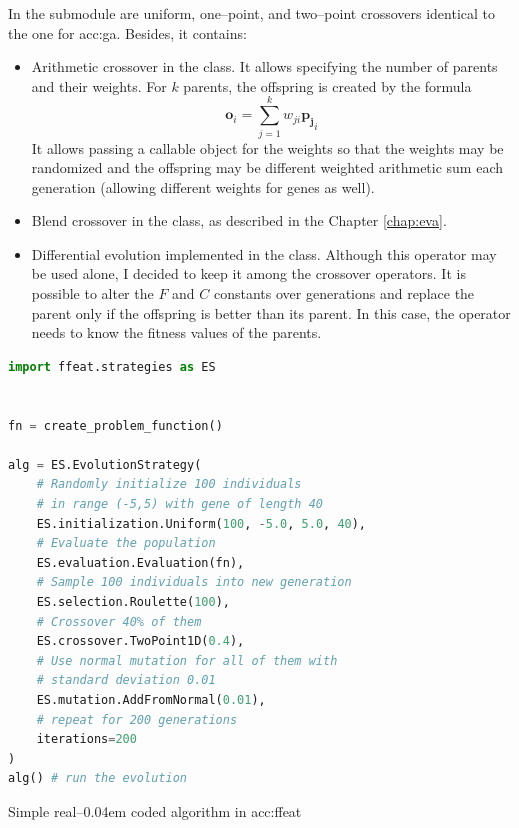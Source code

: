 In the  submodule are uniform, one--point, and two--point crossovers identical to the one for \acrshort{acc:ga}. Besides, it contains:
\begin{itemize}
    \item Arithmetic crossover in the  class. It allows specifying the number of parents and their weights. For $k$ parents, the offspring is created by the formula 
    $$\mathbf{o}_i=\sum_{j=1}^k w_{ji}\mathbf{p_j}_i$$
    It allows passing a callable object for the weights so that the weights may be randomized and the offspring may be different weighted arithmetic sum each generation (allowing different weights for genes as well).
    \item Blend crossover in the  class, as described in the Chapter \ref{chap:eva}.
    \item Differential evolution implemented in the  class. Although this operator may be used alone, I decided to keep it among the crossover operators. It is possible to alter the $F$ and $C$ constants over generations and replace the parent only if the offspring is better than its parent. In this case, the operator needs to know the fitness values of the parents.
\end{itemize}

\begin{algorithm}[b!]
\begin{lstlisting}[language=Python, xrightmargin=18pt]
import ffeat.strategies as ES


fn = create_problem_function()

alg = ES.EvolutionStrategy(
    # Randomly initialize 100 individuals 
    # in range (-5,5) with gene of length 40
    ES.initialization.Uniform(100, -5.0, 5.0, 40),
    # Evaluate the population
    ES.evaluation.Evaluation(fn),
    # Sample 100 individuals into new generation
    ES.selection.Roulette(100),
    # Crossover 40% of them
    ES.crossover.TwoPoint1D(0.4),
    # Use normal mutation for all of them with 
    # standard deviation 0.01
    ES.mutation.AddFromNormal(0.01),
    # repeat for 200 generations
    iterations=200
)
alg() # run the evolution
\end{lstlisting}
\caption{Simple real--\kern0.04em coded algorithm in \acrshort*{acc:ffeat}}
\label{alg:esffeat}
\end{algorithm}

